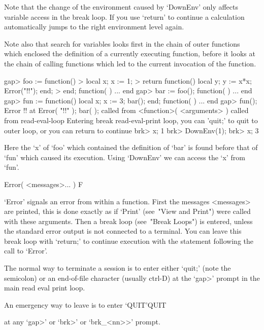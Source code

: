 Note that the change of the environment caused by `DownEnv' only affects
variable access in the break loop. If you use `return' to continue a
calculation {\GAP} automatically jumps to the right environment level
again.

Note also that search for variables looks first in the chain of outer
functions which enclosed the definition of a currently executing
function, before it looks at the chain of calling functions which led
to the current invocation of the function. 

\begintt
gap> foo := function() 
> local x; x := 1; 
> return function() local y; y := x*x; Error("!!"); end; 
> end;  
function(  ) ... end
gap> bar := foo();
function(  ) ... end
gap> fun := function() local x; x := 3; bar(); end;
function(  ) ... end
gap> fun();
Error !! at
Error( "!!" );
bar(  ); called from
<function>( <arguments> ) called from read-eval-loop
Entering break read-eval-print loop, you can 'quit;' to quit to outer loop,
or you can return to continue
brk> x;
1
brk> DownEnv(1);
brk> x;
3
\endtt

Here the `x' of `foo' which contained the definition of `bar' is found 
before that of `fun' which caused its execution. Using `DownEnv' we
can access the `x' from `fun'.


\>Error( <messages>... ) F

`Error' signals an error from within a function. First the messages
<messages> are printed, this is done exactly as if `Print'
(see~"View and Print")
were called with these arguments. Then a break loop (see~"Break Loops") is
entered, unless the standard error output is not connected to a terminal.
You can leave this break loop with `return;' to continue execution with the
statement following the call to `Error'.


The normal way to terminate a {\GAP} session is to enter either
`quit;' (note the semicolon) or an end-of-file character (usually
ctrl-D) at the `gap>' prompt in the main read eval print loop. 

An emergency way to leave {\GAP} is to enter 
\>`QUIT'{QUIT}

at any `gap>'
or `brk>' or `brk_<nn>>' prompt. 

